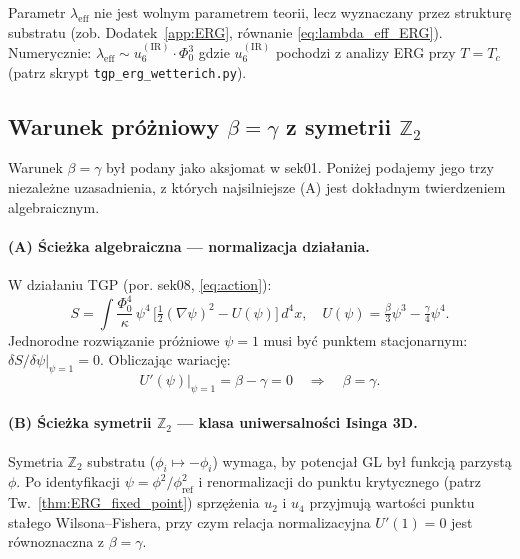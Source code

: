 \begin{uwaga}
Parametr $\lambda_\mathrm{eff}$ nie jest wolnym parametrem teorii, lecz
wyznaczany przez strukturę substratu (zob. Dodatek~\ref{app:ERG},
równanie \eqref{eq:lambda_eff_ERG}). Numerycznie: $\lambda_\mathrm{eff} \sim
u_6^{(\mathrm{IR})} \cdot \Phi_0^3$ gdzie $u_6^{(\mathrm{IR})}$ pochodzi
z analizy ERG przy $T = T_c$ (patrz skrypt \texttt{tgp\_erg\_wetterich.py}).
\end{uwaga}

\subsection{Warunek próżniowy \texorpdfstring{$\beta = \gamma$}{β=γ}
            z symetrii \texorpdfstring{$\mathbb{Z}_2$}{Z₂}}
\label{subsec:beta_gamma_derivation}

Warunek $\beta = \gamma$ był podany jako aksjomat w sek01. Poniżej podajemy
jego trzy niezależne uzasadnienia, z których najsilniejsze (A) jest
dokładnym twierdzeniem algebraicznym.

\paragraph{(A) Ścieżka algebraiczna — normalizacja działania.}
W działaniu TGP (por. sek08, \eqref{eq:action}):
\begin{equation}
  S = \int \frac{\Phi_0^4}{\kappa}\,\psi^4\,
    \bigl[\tfrac{1}{2}(\nabla\psi)^2 - U(\psi)\bigr]\,d^4x,
  \quad U(\psi) = \tfrac{\beta}{3}\psi^3 - \tfrac{\gamma}{4}\psi^4.
\end{equation}
Jednorodne rozwiązanie próżniowe $\psi = 1$ musi być punktem
stacjonarnym: $\delta S / \delta\psi\big|_{\psi=1} = 0$.
Obliczając wariację:
\begin{equation}
  U'(\psi)\big|_{\psi=1} = \beta - \gamma = 0
  \quad\Longrightarrow\quad \beta = \gamma.
\end{equation}

\paragraph{(B) Ścieżka symetrii $\mathbb{Z}_2$ — klasa uniwersalności Isinga 3D.}
Symetria $\mathbb{Z}_2$ substratu ($\phi_i \mapsto -\phi_i$) wymaga, by
potencjał GL był funkcją parzystą $\phi$. Po identyfikacji
$\psi = \phi^2/\phi_\mathrm{ref}^2$ i renormalizacji do punktu krytycznego
(patrz Tw.~\ref{thm:ERG_fixed_point}) sprzężenia $u_2$ i $u_4$ przyjmują
wartości punktu stałego Wilsona–Fishera, przy czym relacja normalizacyjna
$U'(1) = 0$ jest równoznaczna z $\beta = \gamma$.


